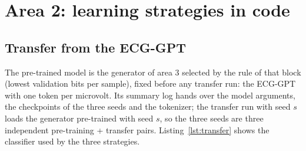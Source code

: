 \section{Area 2: learning strategies in code}\label{sec:strategies-code}

\subsection{Transfer from the ECG-GPT}

The pre-trained model is the generator of area 3 selected by the rule of that block (lowest validation
bits per sample), fixed before any transfer run: the ECG-GPT with one token per microvolt. Its summary
log hands over the model arguments, the checkpoints of the three seeds and the tokenizer; the transfer
run with seed $s$ loads the generator pre-trained with seed $s$, so the three seeds are three independent
pre-training + transfer pairs. Listing~\ref{lst:transfer} shows the classifier used by the three
strategies.



